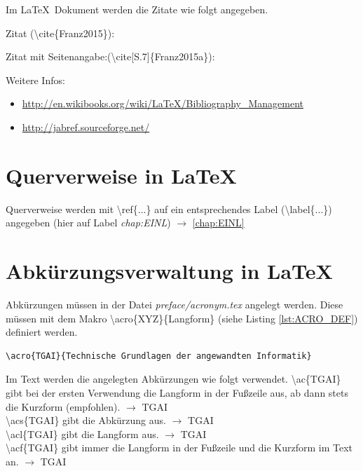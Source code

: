 \documentclass[TGAI_Laborbericht.tex]{subfiles}
\begin{document}
Im \LaTeX ~Dokument werden die Zitate wie folgt angegeben.

\raggedright Zitat (\textbackslash cite\{Franz2015\}): \linebreak
\cite{Franz2015}


\raggedright Zitat mit Seitenangabe:(\textbackslash cite[S.7]\{Franz2015a\}): \linebreak
\cite[S.7]{Franz2015a}\\
\raggedright Weitere Infos:
\begin{itemize}
	\item \href{http://en.wikibooks.org/wiki/LaTeX/Bibliography\_Management}{http://en.wikibooks.org/wiki/LaTeX/Bibliography\_Management}
	\item \href{http://jabref.sourceforge.net/}{http://jabref.sourceforge.net/}
\end{itemize}

\section{Querverweise in \LaTeX}
\raggedright Querverweise werden mit \textbackslash ref\{...\} auf ein entsprechendes Label (\textbackslash label\{...\}) angegeben (hier auf Label \textit{chap:EINL}) \linebreak
$\longrightarrow$ \ref{chap:EINL}

\section{Abkürzungsverwaltung in \LaTeX}
Abkürzungen müssen in der Datei \textit{preface/acronym.tex} angelegt werden. Diese müssen mit dem Makro \textbackslash acro\{XYZ\}\{Langform\} (siehe Listing \ref{lst:ACRO_DEF}) definiert werden.


\begin{lstlisting}[style=LATEX, frame=single, caption=Latex Befehle für Abkürzung, captionpos=b, label=lst:ACRO_DEF]
\acro{TGAI}{Technische Grundlagen der angewandten Informatik}
\end{lstlisting}

Im Text werden die angelegten Abkürzungen wie folgt verwendet.\linebreak
\textbackslash ac\{TGAI\} gibt bei der ersten Verwendung die Langform in der Fußzeile aus, ab dann stets die Kurzform (empfohlen).\linebreak
$\longrightarrow$ \ac{TGAI}\\
\textbackslash acs\{TGAI\} gibt die Abkürzung aus.\linebreak
$\longrightarrow$ \acs{TGAI}\\
\textbackslash acl\{TGAI\} gibt die Langform aus.\linebreak
$\rightarrow$ \acl{TGAI}\\
\textbackslash acf\{TGAI\} gibt immer die Langform in der Fußzeile und die Kurzform im Text an.\linebreak
$\longrightarrow$ \acf{TGAI}
\end{document}
